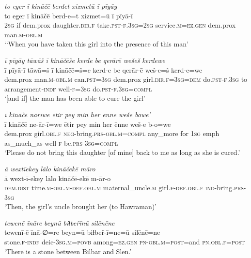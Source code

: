 \ea \label{ZP.44}
\textit{to eger ī kināčē berdet xizmetū ī pīyāy} \\ 
\gll to eger ī kināčē berd-e=t xizmet=ū ī pīyā-ī \\ 
 \textsc{2sg} if dem.prox daughter\textsc{.dir}\textsc{.f} take\textsc{.pst}\textsc{-f}\textsc{.3sg}\textsc{=\textsc{2sg}} service\textsc{.m}\textsc{\textsc{=ez.gen}} dem.prox man\textsc{.m}\textsc{-obl}\textsc{.m} \\ 
\glt `‘When you have taken this girl into the presence of this man'
\z 
 
\ea \label{ZP.45}
\textit{ī pīyāy tāwāš ī kināčēše kerde be qerārē wešeš kerdewe} \\ 
\gll ī pīyā-ī tāwā=š ī kināčē=š=e kerd-e be qerār-ē weš-e=š kerd-e=we \\ 
 dem.prox man\textsc{.m}\textsc{-obl}\textsc{.m} can\textsc{.pst}\textsc{=3sg} dem.prox girl\textsc{.dir}\textsc{.f}\textsc{=3sg}\textsc{=dem} do\textsc{.pst}\textsc{-f}\textsc{.3sg} to arrangement\textsc{-indf} well\textsc{-f}\textsc{=3sg} do\textsc{.pst}\textsc{-f}\textsc{.3sg}\textsc{=compl} \\ 
\glt `[and if] the man has been able to cure the girl'
\z 
 
\ea \label{ZP.48}
\textit{ī kināčē nārīwe ētir pey min her ēnne weše bowe’} \\ 
\gll ī kināčē ne-ār-ī=we ētir pey min her ēnne weš-e b-o=we \\ 
 dem.prox girl\textsc{.obl}\textsc{.f} \textsc{neg-}bring\textsc{.prs}\textsc{-obl}\textsc{.m}\textsc{=compl} any\_more for \textsc{1sg} emph as\_much\_as well\textsc{-f} be\textsc{.prs}\textsc{-3sg}\textsc{=compl} \\ 
\glt `Please do not bring this daughter [of mine] back to me as long as she is cured.'
\z 
 
\ea \label{ZP.49}
\textit{ā wextīekey lālo kināčekē māro} \\ 
\gll ā wext-ī-ekey lālo kināčē-ekē m-ār-o \\ 
 \textsc{dem.dist} time\textsc{.m}\textsc{-obl}\textsc{.m}\textsc{-def}\textsc{.obl}\textsc{.m} maternal\_uncle\textsc{.m} girl\textsc{.f}\textsc{-def}\textsc{.obl}\textsc{.f} \textsc{ind-}bring\textsc{.prs}\textsc{-3sg} \\ 
\glt `Then, the girl’s uncle brought her (to Hawraman)'
\z 
 
\ea \label{ZP.50}
\textit{tewenē īnāre beynū biɫbeřīnū silēnēne} \\ 
\gll tewenī-ē īnā-∅=re beyn=ū biɫbeř-ī=ne=ū silēnē=ne \\ 
 stone\textsc{.f}\textsc{-indf} deic\textsc{-3sg}\textsc{.m}\textsc{=\textsc{povb}} among\textsc{\textsc{=ez.gen}} \textsc{pn}\textsc{-obl}\textsc{.m}\textsc{=\textsc{post}}=and \textsc{pn}\textsc{.obl}\textsc{.f}\textsc{=\textsc{post}} \\ 
\glt `There is a stone between Bilbar and Slen.'
\z 
 
